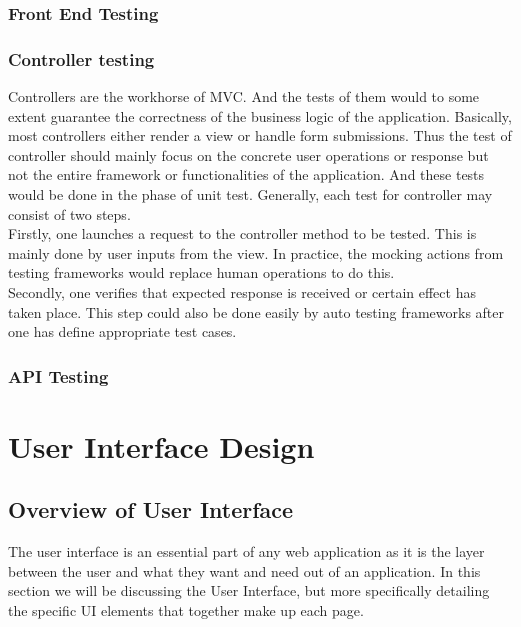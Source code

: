 \documentclass[onecolumn, draftclsnofoot,10pt, compsoc]{article}
\begin{document}
		\subsubsection{Front End Testing}

		\subsubsection{Controller testing}
		Controllers are the workhorse of MVC. And the tests of them would to some extent guarantee the correctness of the business logic of the application. Basically, most controllers either render a view or handle form submissions. Thus the test of controller should mainly focus on the concrete user operations or response but not the entire framework or functionalities of the application. And these tests would be done in the phase of unit test. Generally, each test for controller may consist of two steps. \\
Firstly, one launches a request to the controller method to be tested. This is mainly done by user inputs from the view. In practice, the mocking actions from testing frameworks would replace human operations to do this.\\
Secondly, one verifies that expected response is received or certain effect has taken place. This step could also be done easily by auto testing frameworks after one has define appropriate test cases.


		\subsubsection{API Testing}

\section{User Interface Design}

	\subsection{Overview of User Interface}
	The user interface is an essential part of any web application as it is the layer between the user and what they want and need out of an application. In this section we will be discussing the User Interface, but more specifically detailing the specific UI elements that together make up each page.
\end{document}
